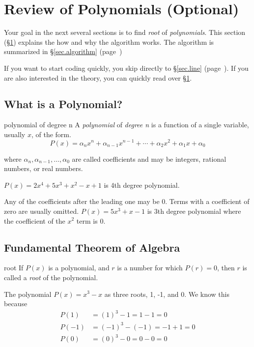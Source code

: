 \section{Review of Polynomials (Optional)}
\label{sec.general}

Your goal in the next several sections is to find \emph{root} of
\emph{polynomials}.  This section (\S\ref{sec.general}) explains
the how and why the algorithm works.  The algorithm is summarized
in \S\ref{sec.algorithm} (page~\pageref{sec.algorithm})

If you want to start coding quickly, you skip directly to
\S\ref{sec.line} (page~\pageref{sec.line}).  If you are also
interested in the theory, you can quickly read over
\S\ref{sec.general}.


\subsection{What is a Polynomial?}

\begin{definition}{polynomial of degree n}{}
  A \emph{polynomial} of \emph{degree n} is a function of a single
  variable, usually $x$, of the form.
  \[P(x) = \alpha_n x^n + \alpha_{n-1} x^{n-1} + \cdots + \alpha_2 x^2 + \alpha_1 x + \alpha_0 \]

  where $\alpha_n, \alpha_{n-1}, \ldots, \alpha_0$ are called
  coefficients and may be integers, rational numbers, or real numbers.
\end{definition}

$P(x) = 2 x^4 + 5 x^3 + x^2 - x + 1$ is 4th degree polynomial.


Any of the coefficients after the leading one may be 0.  Terms with a coefficient of zero
are usually omitted.  $P(x) = 5 x^3 + x - 1$ is 3th degree polynomial
where the coefficient of the $x^2$ term is 0.


\subsection{Fundamental Theorem of Algebra}

\begin{definition}{root}{}
  If $P(x)$ is a polynomial, and $r$ is a number for which $P(r)=0$,
  then $r$ is called a \emph{root} of the polynomial.
\end{definition}

The polynomial $P(x) = x^3 - x$ as three roots, 1, -1, and 0.  We know
this because
\begin{align*}
  P(1) &= (1)^3 - 1 
  = 1 - 1 
  = 0\\[3pt]
  P(-1) &= (-1)^3 - (-1) 
  = -1 + 1 
  = 0\\[3pt]
  P(0) &= (0)^3 - 0
  = 0 - 0 
  = 0  
\end{align*}

